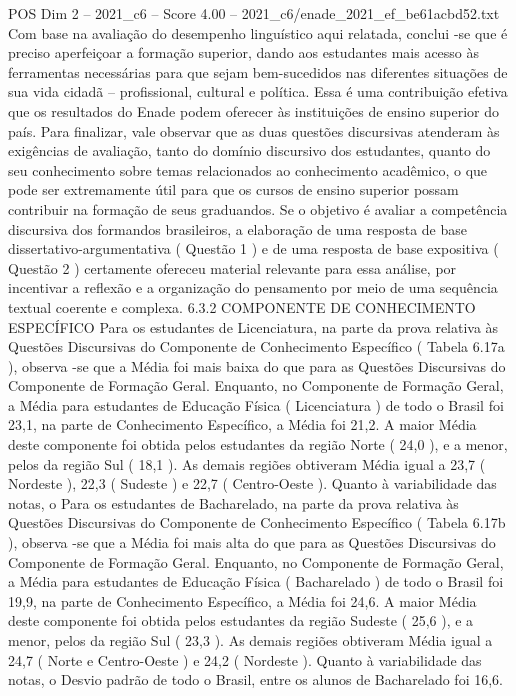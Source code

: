 \begin{textsample}{POS Dim 2 – 2021\_c6 – Score 4.00 – 2021\_c6/enade\_2021\_ef\_be61acbd52.txt}
Com base na avaliação do desempenho linguístico aqui relatada, conclui -se que é preciso aperfeiçoar a formação superior, dando aos estudantes mais acesso às ferramentas necessárias para que sejam bem-sucedidos nas diferentes situações de sua vida cidadã – profissional, cultural e política.
Essa é uma contribuição efetiva que os resultados do Enade podem oferecer às instituições de ensino superior do país.
Para finalizar, vale observar que as duas questões discursivas atenderam às exigências de avaliação, tanto do domínio discursivo dos estudantes, quanto do seu conhecimento sobre temas relacionados ao conhecimento acadêmico, o que pode ser extremamente útil para que os cursos de ensino superior possam contribuir na formação de seus graduandos.
Se o objetivo é avaliar a competência discursiva dos formandos brasileiros, a elaboração de uma resposta de base dissertativo-argumentativa ( Questão 1 ) e de uma resposta de base expositiva ( Questão 2 ) certamente ofereceu material relevante para essa análise, por incentivar a reflexão e a organização do pensamento por meio de uma sequência textual coerente e complexa. 6.3.2 COMPONENTE DE CONHECIMENTO ESPECÍFICO Para os estudantes de Licenciatura, na parte da prova relativa às Questões Discursivas do Componente de Conhecimento Específico ( Tabela 6.17a ), observa -se que a Média foi mais baixa do que para as Questões Discursivas do Componente de Formação Geral.
Enquanto, no Componente de Formação Geral, a Média para estudantes de Educação Física ( Licenciatura ) de todo o Brasil foi 23,1, na parte de Conhecimento Específico, a Média foi 21,2.
A maior Média deste componente foi obtida pelos estudantes da região Norte ( 24,0 ), e a menor, pelos da região Sul ( 18,1 ).
As demais regiões obtiveram Média igual a 23,7 ( Nordeste ), 22,3 ( Sudeste ) e 22,7 ( Centro-Oeste ).
Quanto à variabilidade das notas, o Para os estudantes de Bacharelado, na parte da prova relativa às Questões Discursivas do Componente de Conhecimento Específico ( Tabela 6.17b ), observa -se que a Média foi mais alta do que para as Questões Discursivas do Componente de Formação Geral.
Enquanto, no Componente de Formação Geral, a Média para estudantes de Educação Física ( Bacharelado ) de todo o Brasil foi 19,9, na parte de Conhecimento Específico, a Média foi 24,6.
A maior Média deste componente foi obtida pelos estudantes da região Sudeste ( 25,6 ), e a menor, pelos da região Sul ( 23,3 ).
As demais regiões obtiveram Média igual a 24,7 ( Norte e Centro-Oeste ) e 24,2 ( Nordeste ).
Quanto à variabilidade das notas, o Desvio padrão de todo o Brasil, entre os alunos de Bacharelado foi 16,6.

\end{textsample}
